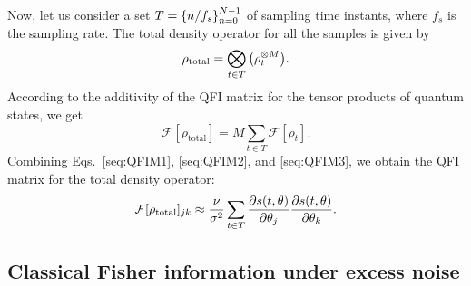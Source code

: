 \documentclass[aps,pra,10pt,showpacs,amsmath,amssymb,floatfix,superscriptaddress,twocolumn]{revtex4-2}
\begin{document}
Now, let us consider a set \(T = \qty{n/f_s}_{n=0}^{N-1}\) of sampling time instants, where \(f_s\) is the sampling rate.
The total density operator for all the samples is given by
\begin{equation}
  \rho_\mathrm{total} = \bigotimes_{t\in T} \qty(\rho_t^{\otimes M}).
\end{equation}
According to the additivity of the QFI matrix for the tensor products of quantum states, we get
\begin{equation} \label{seq:QFIM3}
  \mathcal F[\rho_\mathrm{total}] = M \sum_{t\in T}  \mathcal F[\rho_t].
\end{equation}
Combining Eqs.~\eqref{seq:QFIM1}, \eqref{seq:QFIM2}, and \eqref{seq:QFIM3}, we obtain the QFI matrix for the total density operator:
\begin{equation} \label{seq:QFIM}
  \mathcal{F}[\rho_\mathrm{total}]_{jk}
  \approx \frac{\nu}{\sigma^2} \sum_{t\in T} \pdv{s(t,\theta)}{\theta_j} \pdv{s(t, \theta)}{\theta_k}.
\end{equation}


\subsection{Classical Fisher information under excess noise}
\end{document}
